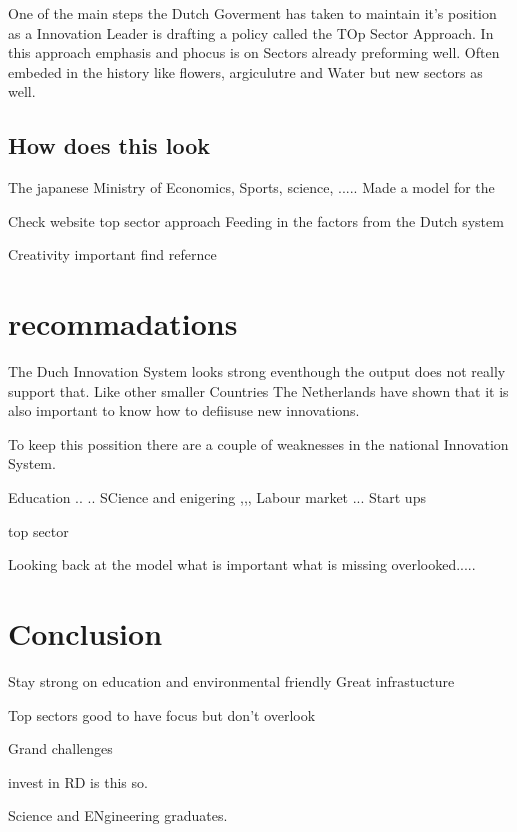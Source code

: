 \documentclass[a4paper, 11pt]{article}
\begin{document}
One of the main steps the Dutch Goverment has taken to maintain it's position as a Innovation Leader is drafting a policy called the TOp Sector Approach. In this approach emphasis and phocus is on Sectors already preforming well.
Often embeded in the history like flowers, argiculutre and Water but new sectors as well.






\subsection{How does this look}

The japanese Ministry of Economics, Sports, science, ..... Made a model for the 

Check website top sector approach
Feeding in the factors from the Dutch system

Creativity important find refernce


\section{recommadations}

The Duch Innovation System looks strong eventhough the output does not really support that. Like other smaller Countries The Netherlands have shown that it is also important to know how to defiisuse new innovations. 

To keep this possition there are a couple of weaknesses in the national Innovation System.

Education
..
..
SCience and enigering
,,,
Labour market
...
Start ups

top sector

Looking back at the model what is important what is missing overlooked.....



\section{Conclusion}


Stay strong on education and environmental friendly 
Great infrastucture 

Top sectors good to have focus but don't overlook

Grand challenges

invest in RD is this so.

Science and ENgineering graduates.





\renewcommand{\textbf}{}
\renewcommand{\bf}{}
{}
\end{document}
